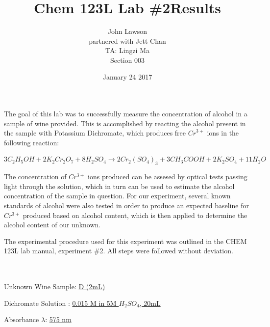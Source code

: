 \documentclass[a4paper,12pt]{article}
\title{Chem 123L Lab \#2}
\date{January 24 2017}
\author{John Lawson\\partnered with Jett Chan\\TA: Lingzi Ma\\Section 003}
\begin{document}
\maketitle
\newpage

The goal of this lab was to successfully measure the concentration of alcohol in
a sample of wine provided. This is accomplished by reacting the alcohol present
in the sample with Potassium Dichromate, which produces free ${Cr}^{3+}$ ions in the
following reaction:


\begin{center}
 $3C_{2}H_{5}OH + 2K_{2}Cr_{2}O_{7} + 8H_{2}SO_{4} \rightarrow 2Cr_{2}(SO_{4})_{3} + 3CH_{3}COOH + 2K_{2}SO_{4} + 11H_{2}O$
\end{center}

The concentration of $Cr^{3+}$ ions produced can be assesed by optical tests
passing light through the solution, which in turn can be used to estimate the
alcohol concentration of the sample in question. For our experiment, several
known standards of alcohol were also tested in order to produce an expected
baseline for $Cr^{3+}$ produced based on alcohol content, which is then applied to
determine the alcohol content of our unknown.

The experimental procedure used for this experiment was outlined in the CHEM 123L
lab manual, experiment \#2. All steps were followed without deviation.
\newpage


\noindent

\title{Results}\\~\\

Unknown Wine Sample: \underline{D (2mL)}

\lbrack Dichromate Solution \rbrack: \underline{0.015 M in 5M $H_{2}SO_{4}$, 20mL}

Absorbance $\lambda$: \underline{575 nm}
\end{document}
